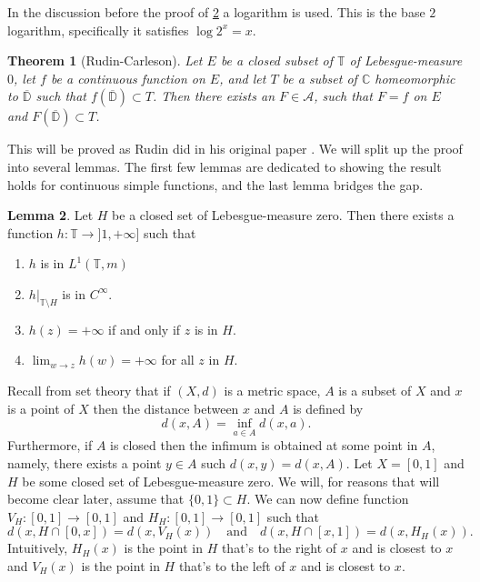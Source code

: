 \documentclass[a4paper,12pt,twoside,BCOR=10mm]{scrbook}
\newtheorem{theorem}{Theorem}[section]
\theoremstyle{definition}
\theoremstyle{definition}
\newtheorem{lemma}[theorem]{Lemma}
\theoremstyle{definition}
\begin{document}
\label{index27}
In the discussion before the proof of \ref{mylemma} a logarithm is used.
This is the base $2$ logarithm, specifically it satisfies $\log 2^x = x$.

\begin{theorem}[Rudin-Carleson]
\label{rudincarleson}
Let $E$ be a closed subset of $\mathbb{T}$ of Lebesgue-measure $0$,
	let $f$ be a continuous function on $E$,
	and let $T$ be a subset of $\mathbb{C}$ homeomorphic to $\overline{\mathbb{D}}$ such that $f(\overline{\mathbb{D}}) \subset T$.
Then there exists an $F \in \mathcal{A}$, such that $F = f$ on $E$ and $F(\overline{\mathbb{D}}) \subset T$.
\end{theorem}
This will be proved as Rudin did in his original paper \citep{rudin}.
We will split up the proof into several lemmas.
The first few lemmas are dedicated to showing the result holds for continuous simple functions, and the last lemma bridges the gap.
\begin{lemma}
\label{mylemma}
Let $H$ be a closed set of Lebesgue-measure zero.
Then there exists a function $h: \mathbb{T} \rightarrow ]1, +\infty]$ such that 
\begin{enumerate}
\item
$h$ is in $L^1(\mathbb{T}, m)$
\item
$h|_{\mathbb{T} \setminus H}$ is in $C^{\infty}$.
\item
$h(z) = +\infty$ if and only if $z$ is in $H$.
\item
$\lim_{w \rightarrow z} h(w) = +\infty$ for all $z$ in $H$.
\end{enumerate}
\end{lemma}
Recall from set theory that if $(X, d)$ is a metric space, $A$ is a subset of $X$ and $x$ is a point of $X$ then the distance between $x$ and $A$ is defined by
\[
	d(x, A) = \inf_{a \in A} d(x, a).
\]
Furthermore, if $A$ is closed then the infimum is obtained at some point in $A$, namely, there exists a point $y \in A$ such $d(x, y) = d(x, A)$.
Let $X = [0, 1]$ and $H$ be some closed set of Lebesgue-measure zero.
We will, for reasons that will become clear later, assume that $\{0, 1\} \subset H$.
\label{index28}
We can now define function $V_H: [0, 1] \rightarrow [0, 1]$ and $H_H: [0, 1] \rightarrow [0, 1]$ such that
\[
	d(x, H \cap [0, x]) = d(x, V_H(x))
	\quad \text{and} \quad
	d(x, H \cap [x, 1]) = d(x, H_H(x)).
\]
Intuitively, $H_H(x)$ is the point in $H$ that's to the right of $x$ and is closest to $x$ and $V_H(x)$ is the point in $H$ that's to the left of $x$ and is closest to $x$.
\end{document}
